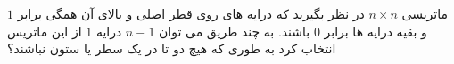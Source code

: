 \exercise
ماتریسی 
$n \times n$
در نظر بگیرید که درایه های روی قطر اصلی و بالای آن همگی برابر 
$1$
 و بقیه درایه ها برابر 
$0$
  باشند. به چند طریق می توان 
$n - 1$
  درایه 
$1$
   از این ماتریس انتخاب کرد به طوری که هیچ دو تا در یک سطر یا ستون نباشند؟